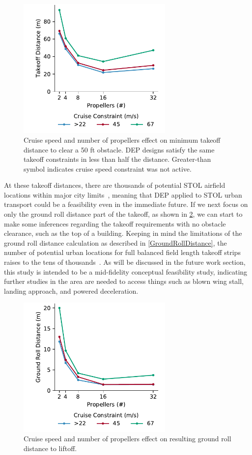 \documentclass[conf]{new-aiaa}
\begin{document}
\begin{figure}[htbp]
    \centering
    \includegraphics[trim={0.3cm 0cm 0.0cm 0cm},clip,width=3.0in]{takeoff_speed}
    \caption{Cruise speed and number of propellers effect on minimum takeoff distance to clear a 50 ft obstacle. DEP designs satisfy the same takeoff constraints in less than half the distance.  Greater-than symbol indicates cruise speed constraint was not active. }
    \label{fig:takeoff_speed}
\end{figure}

At these takeoff distances, there are thousands of potential STOL airfield locations within major city limits~\cite{Courtin:2018aa}, meaning that DEP applied to STOL urban transport could be a feasibility even in the immediate future. If we next focus on only the ground roll distance part of the takeoff, as shown in \cref{fig:accel_speed}, we can start to make some inferences regarding the takeoff requirements with no obstacle clearance, such as the top of a building. Keeping in mind the limitations of the ground roll distance calculation as described in \cref{GroundRollDistance}, the number of potential urban locations for full balanced field length takeoff strips raises to the tens of thousands~\cite{Courtin:2018aa}. As will be discussed in the future work section, this study is intended to be a mid-fidelity conceptual feasibility study, indicating further studies in the area are needed to access things such as blown wing stall, landing approach, and powered deceleration.

\begin{figure}[htbp]
    \centering
    \includegraphics[trim={0.3cm 0cm 0.0cm 0cm},clip,width=3.0in]{Accel_Speed}
    \caption{Cruise speed and number of propellers effect on resulting ground roll distance to liftoff. }
    \label{fig:accel_speed}
\end{figure}
\end{document}
